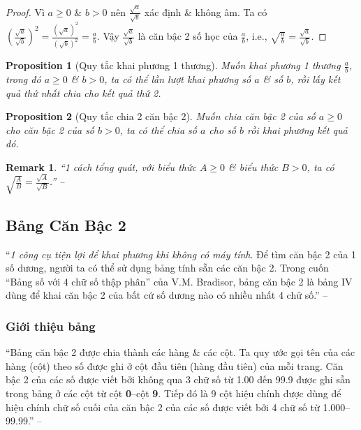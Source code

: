 \documentclass{article}
\numberwithin{equation}{section}
\newtheorem{proposition}{Proposition}[section]
\newtheorem{remark}{Remark}[section]
\begin{document}
\begin{proof}
	Vì $a\ge 0$ \& $b > 0$ nên $\frac{\sqrt{a}}{\sqrt{b}}$ xác định \& không âm. Ta có $\left(\frac{\sqrt{a}}{\sqrt{b}}\right)^2 = \frac{(\sqrt{a})^2}{(\sqrt{b})^2} = \frac{a}{b}$. Vậy $\frac{\sqrt{a}}{\sqrt{b}}$ là căn bậc 2 số học của $\frac{a}{b}$, i.e., $\sqrt{\frac{a}{b}} = \frac{\sqrt{a}}{\sqrt{b}}$.
\end{proof}

\begin{proposition}[Quy tắc khai phương 1 thương]
	Muốn khai phương 1 thương $\frac{a}{b}$, trong đó $a\ge 0$ \& $b > 0$, ta có thể lần lượt khai phương số $a$ \& số $b$, rồi lấy kết quả thứ nhất chia cho kết quả thứ 2.
\end{proposition}

\begin{proposition}[Quy tắc chia 2 căn bậc 2]
	Muốn chia căn bậc 2 của số $a\ge 0$ cho căn bậc 2 của số $b > 0$, ta có thể chia số $a$ cho số $b$ rồi khai phương kết quả đó.
\end{proposition}

\begin{remark}
	``1 cách tổng quát, với biểu thức $A\ge 0$ \& biểu thức $B > 0$, ta có $\sqrt{\frac{A}{B}} = \frac{\sqrt{A}}{\sqrt{B}}$.'' -- \cite[p. 18]{SGK_Toan_9_tap_1}
\end{remark}

\subsection{Bảng Căn Bậc 2}
``\textit{1 công cụ tiện lợi để khai phương khi không có máy tính}. Để tìm căn bậc 2 của 1 số dương, người ta có thể sử dụng bảng tính sẵn các căn bậc 2. Trong cuốn ``Bảng số với 4 chữ số thập phân'' của V.M. Bradisor, bảng căn bậc 2 là bảng IV dùng để khai căn bậc 2 của bất cứ số dương nào có nhiều nhất 4 chữ số.'' -- \cite[p. 20]{SGK_Toan_9_tap_1}

\subsubsection{Giới thiệu bảng}
``Bảng căn bậc 2 được chia thành các hàng \& các cột. Ta quy ước gọi tên của các hàng (cột) theo số được ghi ở cột đầu tiên (hàng đầu tiên) của mỗi trang. Căn bậc 2 của các số được viết bởi không qua 3 chữ số từ 1.00 đến 99.9 được ghi sẵn trong bảng ở các cột từ cột \textbf{0}--cột \textbf{9}. Tiếp đó là 9 cột hiệu chính được dùng để hiệu chính chữ số cuối của căn bậc 2 của các số được viết bởi 4 chữ số từ 1.000--99.99.'' -- \cite[pp. 20--21]{SGK_Toan_9_tap_1}
\end{document}
